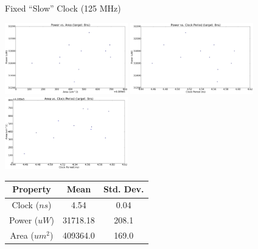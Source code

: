 \documentclass{beamer}
\begin{document}
\begin{frame}{Fixed ``Slow'' Clock (125 MHz)}

\noindent
\includegraphics[width=0.4\textwidth]{../img/dse_slow/powerVSarea.png}\hspace{0.2\textwidth}%
\includegraphics[width=0.4\textwidth]{../img/dse_slow/powerVSclock.png}\\[2em]
\includegraphics[width=0.4\textwidth]{../img/dse_slow/areaVSclock.png}\hspace{0.2\textwidth}%
    \tiny
    \begin{tabular}{c | c | c }
Property & Mean & Std. Dev.  \\ \hline
Clock ($ns$) & 4.54 & 0.04 \\
Power ($uW$) & 31718.18 & 208.1 \\
Area ($um^2$) & 409364.0 & 169.0 \\
\end{tabular} \par
\end{frame}
\end{document}
